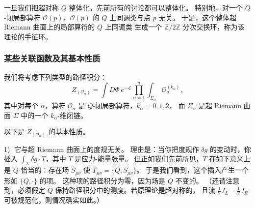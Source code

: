 一旦我们把超对称 $Q$ 整体化，先前所有的讨论都可以整体化。
特别地，对一个 $Q$-闭局部算符 $\mathcal{O}(p)$，$\mathcal{O}(p)$ 的 $Q$ 上同调类与点 $p$ 无关。
于是，这个整体超 Riemann 曲面上的局部算符的 $Q$ 上同调类
生成一个 $\mathbb{Z}/2\mathbb{Z}$ 分次交换环，称为该理论的手征环。

\subsubsection{某些关联函数及其基本性质}

我们将考虑下列类型的路径积分：
\[
Z_{(\mathcal{O}_\alpha)}=\int D\Phi\,e^{-\mathcal{L}}
\prod_{\alpha=1}^{n}\int_{\Sigma_\alpha}\mathcal{O}_\alpha^{(k_\alpha)},
\]
其中对每个 $\alpha$，算符 $\mathcal{O}_\alpha$ 是 $Q$-闭局部算符，$k_\alpha=0,1,2$，
而 $\Sigma_\alpha$ 是超 Riemann 曲面 $\Sigma$ 中的一个 $k_\alpha$-维闭链。

以下是 $Z_{(\mathcal{O}_\alpha)}$ 的基本性质。

1). 它与超 Riemann 曲面上的度规无关。
理由是：当你把度规作 $\delta g$ 的变动时，你插入 $\int_\Sigma \delta g\cdot T$，其中 $T$ 是应力-能量张量。
但正如我们先前所见，$T$ 在如下意义上是 $Q$-恰当的：存在场 $S_{\mu\nu}$ 使 $T_{\mu\nu}=\{Q,S_{\mu\nu}\}$。
于是我们看到，这个插入产生一个形如 $\{Q,\cdot\}$ 的项。
这种项的路径积分为零，因为场是 $Q$ 不变的。
（还请注意到，必须假定 $Q$ 保持路径积分中的测度。若原理论是超对称的，
且流 $\frac12J_L-\frac12J_R$ 可被规范化，则情况确实如此。）



